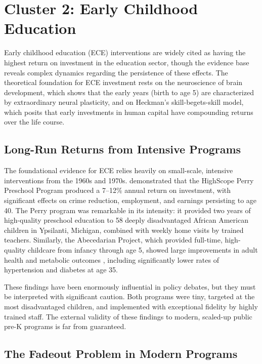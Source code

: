 \documentclass[12pt,letterpaper]{article}
\begin{document}
\section{Cluster 2: Early Childhood Education}

Early childhood education (ECE) interventions are widely cited as having the highest return on investment in the education sector, though the evidence base reveals complex dynamics regarding the persistence of these effects. The theoretical foundation for ECE investment rests on the neuroscience of brain development, which shows that the early years (birth to age 5) are characterized by extraordinary neural plasticity, and on Heckman's skill-begets-skill model, which posits that early investments in human capital have compounding returns over the life course.

\subsection{Long-Run Returns from Intensive Programs}

The foundational evidence for ECE relies heavily on small-scale, intensive interventions from the 1960s and 1970s. \citet{heckman2010} demonstrated that the HighScope Perry Preschool Program produced a 7--12\% annual return on investment, with significant effects on crime reduction, employment, and earnings persisting to age 40. The Perry program was remarkable in its intensity: it provided two years of high-quality preschool education to 58 deeply disadvantaged African American children in Ypsilanti, Michigan, combined with weekly home visits by trained teachers. Similarly, the Abecedarian Project, which provided full-time, high-quality childcare from infancy through age 5, showed large improvements in adult health and metabolic outcomes \citep{campbell2014}, including significantly lower rates of hypertension and diabetes at age 35.

These findings have been enormously influential in policy debates, but they must be interpreted with significant caution. Both programs were tiny, targeted at the most disadvantaged children, and implemented with exceptional fidelity by highly trained staff. The external validity of these findings to modern, scaled-up public pre-K programs is far from guaranteed.

\subsection{The Fadeout Problem in Modern Programs}
\end{document}
